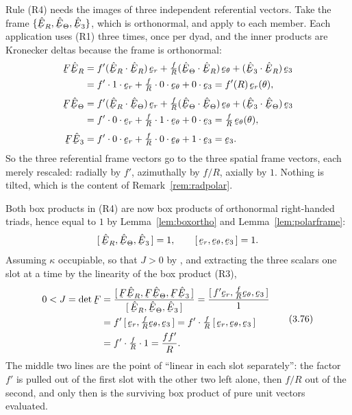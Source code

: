 Rule (R4) needs the images of three independent referential vectors. Take
the frame $\{\hER,\hETh,\hbE_{3}\}$, which is orthonormal, and apply
 to each member. Each application uses (R1) three times, once per
dyad, and the inner products are Kronecker deltas because the frame is
orthonormal:
\[
\begin{aligned}
   \bF\hER&=f'(\ip{\hER}{\hER})\,\ber
     +\tfrac{f}{R}(\ip{\hETh}{\hER})\,\bet
     +(\ip{\hbE_{3}}{\hER})\,\be_{3}\\
   &=f'\cdot1\cdot\ber+\tfrac{f}{R}\cdot0\cdot\bet+0\cdot\be_{3}
    =f'(R)\,\ber(\theta),\\[1mm]
   \bF\hETh&=f'(\ip{\hER}{\hETh})\,\ber
     +\tfrac{f}{R}(\ip{\hETh}{\hETh})\,\bet
     +(\ip{\hbE_{3}}{\hETh})\,\be_{3}\\
   &=f'\cdot0\cdot\ber+\tfrac{f}{R}\cdot1\cdot\bet+0\cdot\be_{3}
    =\tfrac{f}{R}\,\bet(\theta),\\[1mm]
   \bF\hbE_{3}&=f'\cdot0\cdot\ber+\tfrac{f}{R}\cdot0\cdot\bet
     +1\cdot\be_{3}=\be_{3}.
\end{aligned}
\]
So the three referential frame vectors go to the three spatial frame
vectors, each merely rescaled: radially by $f'$, azimuthally by $f/R$,
axially by $1$. Nothing is tilted, which is the content of
Remark~\ref{rem:radpolar}.

Both box products in (R4) are now box products of orthonormal
right-handed triads, hence equal to $1$ by
Lemma~\ref{lem:boxortho} and Lemma~\ref{lem:polarframe}:
\[
   \tbox{\hER}{\hETh}{\hbE_{3}}=1,
   \qquad
   \tbox{\ber}{\bet}{\be_{3}}=1 .
\]
Assuming $\kappa$ occupiable, so that $J>0$ by , and extracting the
three scalars one slot at a time by the linearity of the box product (R3),
\begin{equation}
\begin{aligned}
   0<J=\det\bF
   &=\frac{\tbox{\bF\hER}{\bF\hETh}{\bF\hbE_{3}}}
          {\tbox{\hER}{\hETh}{\hbE_{3}}}
    =\frac{\tbox{f'\ber}{\tfrac{f}{R}\bet}{\be_{3}}}{1}\\
   &=f'\,\tbox{\ber}{\tfrac{f}{R}\bet}{\be_{3}}
    =f'\cdot\tfrac{f}{R}\,\tbox{\ber}{\bet}{\be_{3}}\\
   &=f'\cdot\tfrac{f}{R}\cdot1=\frac{ff'}{R} .
\end{aligned}
   \tag{3.76}\label{eq:3.76}
\end{equation}
The middle two lines are the point of ``linear in each slot separately'':
the factor $f'$ is pulled out of the first slot with the other two left
alone, then $f/R$ out of the second, and only then is the surviving box
product of pure unit vectors evaluated.

